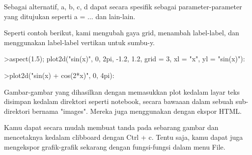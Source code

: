 \documentclass[a4paper,10pt]{article}
\begin{document}
\begin{eulernotebook}
\begin{eulercomment}
\begin{eulercomment}
\begin{eulercomment}
\begin{eulercomment}
\begin{eulercomment}
Sebagai alternatif, a, b, c, d dapat secara spesifik sebagai parameter-parameter yang ditujukan seperti a = ...
dan lain-lain.

Seperti contoh berikut, kami mengubah gaya grid, menambah label-label, dan menggunakan label-label vertikan
untuk sumbu-y.
\end{eulercomment}
\begin{eulerprompt}
>aspect(1.5); plot2d("sin(x)", 0, 2pi, -1.2, 1.2, grid = 3, xl = "x", yl = "sin(x)"):
\end{eulerprompt}
\begin{eulerprompt}
>plot2d("sin(x) + cos(2*x)", 0, 4pi):
\end{eulerprompt}
\begin{eulercomment}
Gambar-gambar yang dihasilkan dengan memasukkan plot kedalam layar teks disimpan kedalam direktori seperti
notebook, secara bawaaan dalam sebuah sub-direktori bernama "images". Mereka juga menggunakan dengan ekspor
HTML.

Kamu dapat secara mudah membuat tanda pada sebarang gambar dan mencetaknya kedalam clibboard dengan Ctrl + c.
Tentu saja, kamu dapat juga mengekspor grafik-grafik sekarang dengan fungsi-fungsi dalam menu File.


\end{eulercomment}
\end{eulercomment}
\end{eulercomment}
\end{eulercomment}
\end{eulercomment}
\end{eulernotebook}
\end{document}

